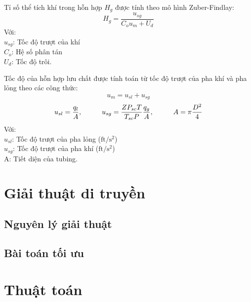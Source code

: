 \documentclass[12pt,a4paper]{report}
\begin{document}
Tỉ số thể tích khí trong hỗn hợp $H_g$ được tính theo mô hình Zuber-Findlay:
	\begin{equation}\label{eqn:gas-holdup}
		H_g = \dfrac{u_{sg}}{C_ou_m + U_d}
	\end{equation}
Với:\\
\hspace*{1cm}$u_{sg}$: Tốc độ trượt của khí\\
\hspace*{1cm}$C_o$: Hệ số phân tán\\
\hspace*{1cm}$U_d$: Tốc độ trôi.

Tốc độ của hỗn hợp lưu chất được tính toán từ tốc độ trượt của pha khí và pha lỏng theo các công thức:
	\begin{equation}\label{eqn:mixture-velocity}
		u_m = u_{sl} + u_{sg}
	\end{equation}
	\begin{equation}\label{eqn:usg-usl}
		u_{sl} = \dfrac{q_l}{A},\hspace*{1cm} u_{sg} = \dfrac{ZP_{sc}T}{T_{sc}P}\dfrac{q_g}{A},\hspace*{1cm} A = \pi\dfrac{D^2}{4}
	\end{equation}
Với:\\
\hspace*{1cm}$u_{sl}$: Tốc độ trượt của pha lỏng ($\text{ft}/\text{s}^2$)\\
\hspace*{1cm}$u_{sg}$: Tốc độ trượt của pha khí ($\text{ft}/\text{s}^2$)\\
\hspace*{1cm}A: Tiết diện của tubing.

\section{Giải thuật di truyền}
\subsection{Nguyên lý giải thuật}

\subsection{Bài toán tối ưu}

\section{Thuật toán}
\end{document}
